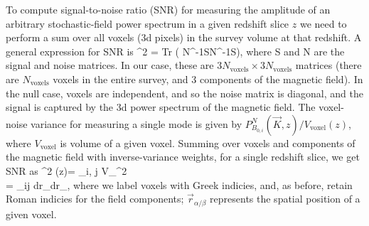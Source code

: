 To compute signal-to-noise ratio (SNR) for measuring the amplitude of an arbitrary stochastic-field power spectrum in a given redshift slice $z$ we need to perform a sum over all voxels (3d pixels) in the survey volume at that redshift. A general expression for SNR is 
\beq
{}^2 =  Tr \left( N^{-1}SN^{-1}S\right),
\label{eq:snr_general}
\eeq
where S and N are the signal and noise matrices. In our case, these are $3N_\text{voxels}\times 3N_\text{voxels}$ matrices (there are $N_\text{voxels}$ voxels in the entire survey, and 3 components of the magnetic field). In the null case, voxels are independent, and so the noise matrix is diagonal, and the signal is captured by the 3d power spectrum of the magnetic field. The voxel-noise  variance for measuring a single mode is given by $P^N_{B_{0,i}}(\vec K, z)/V_\text{voxel} (z)$, where $V_\text{voxel}$ is volume of a given voxel. Summing over voxels and components of the magnetic field with inverse-variance weights, for a single redshift slice, we get SNR as
\beq
\bga
{}^2 (z)=  \sum_{i\alpha, j\beta}  V_^2\\=
 \sum_{ij} \int d\vec r_\alpha \int d\vec r_\beta {},
\ega
\label{eq:snr_z_step1}
\eeq
where we label voxels with Greek indicies, and, as before, retain Roman indicies for the field components; $\vec r_{\alpha/\beta}$ represents the spatial position of a given voxel. 


